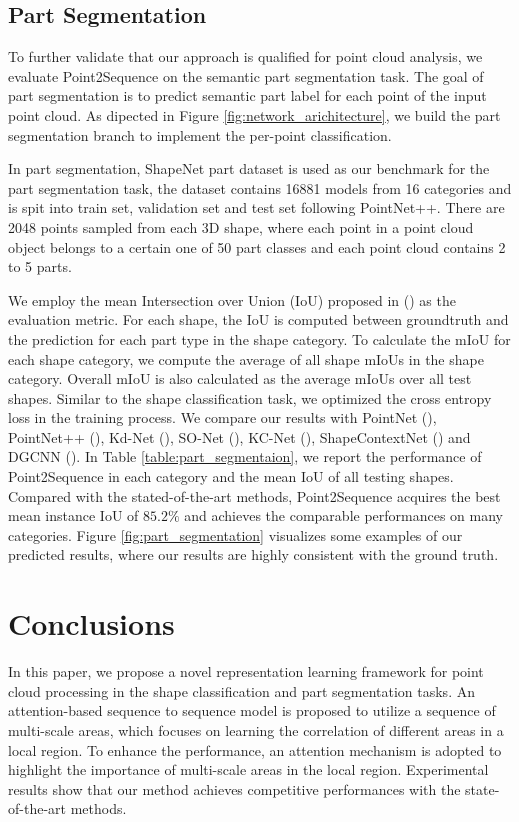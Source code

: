 \documentclass[letterpaper]{article}
\begin{document}
\subsection{Part Segmentation}
To further validate that our approach is qualified for point cloud analysis, we evaluate Point2Sequence on the semantic part segmentation task.
The goal of part segmentation is to predict semantic part label for each point of the input point cloud.
As dipected in Figure \ref{fig:network_arichitecture}, we build the part segmentation branch to implement the per-point classification.

In part segmentation, ShapeNet part dataset is used as our benchmark for the part segmentation task, the dataset contains 16881 models from 16 categories and is spit into train set, validation set and test set following PointNet++.
There are 2048 points sampled from each 3D shape, where each point in a point cloud object belongs to a certain one of 50 part classes and each point cloud contains 2 to 5 parts.

We employ the mean Intersection over Union (IoU) proposed in (\citealt{qi2017pointnet}) as the evaluation metric. 
For each shape, the IoU is computed between groundtruth and the prediction for each part type in the shape category.
To calculate the mIoU for each shape category, we compute the average of all shape mIoUs in the shape category.
Overall mIoU is also calculated as the average mIoUs over all test shapes.
Similar to the shape classification task, we optimized the cross entropy loss in the training process. 
We compare our results with PointNet (\citealt{qi2017pointnet}), PointNet++ (\citealt{qi2017pointnet++}), Kd-Net (\citealt{klokov2017escape}), SO-Net (\citealt{li2018so}), KC-Net (\citealt{shen2018mining}), ShapeContextNet (\citealt{xie2018attentional}) and DGCNN (\citealt{wang2018dynamic}).
In Table \ref{table:part_segmentaion}, we report the performance of Point2Sequence in each category and the mean IoU of all testing shapes.
Compared with the stated-of-the-art methods, Point2Sequence acquires the best mean instance IoU of $85.2\%$ and achieves the comparable performances on many categories.
Figure \ref{fig:part_segmentation} visualizes some examples of our predicted results, where our results are highly consistent with the ground truth. 
\section{Conclusions}
In this paper, we propose a novel representation learning framework for point cloud processing in the shape classification and part segmentation tasks.
An attention-based sequence to sequence model is proposed to utilize a sequence of multi-scale areas, which focuses on learning the correlation of different areas in a local region. 
To enhance the performance, an attention mechanism is adopted to highlight the importance of multi-scale areas in the local region.
Experimental results show that our method achieves competitive performances with the state-of-the-art methods.
\end{document}
